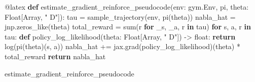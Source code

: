 \documentclass[
  letterpaper,
  DIV=11,
  numbers=noendperiod]{scrreprt}
\newenvironment{Shaded}{\begin{snugshade}}{\end{snugshade}}
\newcommand{\AttributeTok}[1]{\textcolor[rgb]{0.40,0.45,0.13}{#1}}
\newcommand{\BuiltInTok}[1]{\textcolor[rgb]{0.00,0.23,0.31}{#1}}
\newcommand{\ControlFlowTok}[1]{\textcolor[rgb]{0.00,0.23,0.31}{\textbf{#1}}}
\newcommand{\KeywordTok}[1]{\textcolor[rgb]{0.00,0.23,0.31}{\textbf{#1}}}
\newcommand{\NormalTok}[1]{\textcolor[rgb]{0.00,0.23,0.31}{#1}}
\newcommand{\OperatorTok}[1]{\textcolor[rgb]{0.37,0.37,0.37}{#1}}
\newcommand{\StringTok}[1]{\textcolor[rgb]{0.13,0.47,0.30}{#1}}
\theoremstyle{plain}
\theoremstyle{plain}
\theoremstyle{definition}
\theoremstyle{definition}
\theoremstyle{remark}
\begin{document}
\begin{Shaded}
\begin{Highlighting}[]
\AttributeTok{@latex}
\KeywordTok{def}\NormalTok{ estimate\_gradient\_reinforce\_pseudocode(env: gym.Env, pi, theta: Float[Array, }\StringTok{" D"}\NormalTok{]):}
\NormalTok{    tau }\OperatorTok{=}\NormalTok{ sample\_trajectory(env, pi(theta))}
\NormalTok{    nabla\_hat }\OperatorTok{=}\NormalTok{ jnp.zeros\_like(theta)}
\NormalTok{    total\_reward }\OperatorTok{=} \BuiltInTok{sum}\NormalTok{(r }\ControlFlowTok{for}\NormalTok{ \_s, \_a, r }\KeywordTok{in}\NormalTok{ tau)}
    \ControlFlowTok{for}\NormalTok{ s, a, r }\KeywordTok{in}\NormalTok{ tau:}
        \KeywordTok{def}\NormalTok{ policy\_log\_likelihood(theta: Float[Array, }\StringTok{" D"}\NormalTok{]) }\OperatorTok{{-}\textgreater{}} \BuiltInTok{float}\NormalTok{:}
            \ControlFlowTok{return}\NormalTok{ log(pi(theta)(s, a))}
\NormalTok{        nabla\_hat }\OperatorTok{+=}\NormalTok{ jax.grad(policy\_log\_likelihood)(theta) }\OperatorTok{*}\NormalTok{ total\_reward}
    \ControlFlowTok{return}\NormalTok{ nabla\_hat}

\NormalTok{estimate\_gradient\_reinforce\_pseudocode}
\end{Highlighting}
\end{Shaded}
\end{document}
